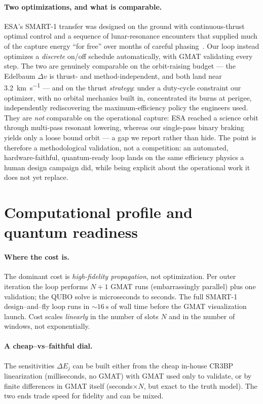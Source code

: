 \documentclass[11pt,a4paper]{article}
\theoremstyle{plain}
\newcommand{\dv}{\Delta v}
\begin{document}
\paragraph{Two optimizations, and what is comparable.} ESA's SMART-1 transfer
was designed on the ground with continuous-thrust optimal control and a
sequence of lunar-resonance encounters that supplied much of the capture
energy ``for free'' over months of careful phasing~\cite{Racca2002,Milligan2005}.
Our loop instead optimizes a \emph{discrete} on/off schedule automatically,
with GMAT validating every step. The two are genuinely comparable on the
orbit-raising budget --- the Edelbaum $\dv$ is thrust- and method-independent,
and both land near \SI{3.2}{\km\per\second} --- and on the thrust
\emph{strategy}: under a duty-cycle constraint our optimizer, with no orbital
mechanics built in, concentrated its burns at perigee, independently
rediscovering the maximum-efficiency policy the engineers used. They are
\emph{not} comparable on the operational capture: ESA reached a science orbit
through multi-pass resonant lowering, whereas our single-pass binary braking
yields only a loose bound orbit --- a gap we report rather than hide. The point
is therefore a methodological validation, not a competition: an automated,
hardware-faithful, quantum-ready loop lands on the same efficiency physics a
human design campaign did, while being explicit about the operational work it
does not yet replace.

\section{Computational profile and quantum readiness}\label{sec:cost}
\paragraph{Where the cost is.} The dominant cost is \emph{high-fidelity
propagation}, not optimization. Per outer iteration the loop performs $N{+}1$
GMAT runs (embarrassingly parallel) plus one validation; the QUBO solve is
microseconds to seconds. The full SMART-1 design--and--fly loop runs in
$\sim\SI{16}{\second}$ of wall time before the GMAT visualization launch. Cost
scales \emph{linearly} in the number of slots $N$ and in the number of
windows, not exponentially.

\paragraph{A cheap--vs--faithful dial.} The sensitivities $\Delta E_j$ can be
built either from the cheap in-house CR3BP linearization (milliseconds, no
GMAT) with GMAT used only to validate, or by finite differences in GMAT
itself (seconds$\times N$, but exact to the truth model). The two ends trade
speed for fidelity and can be mixed.
\end{document}
